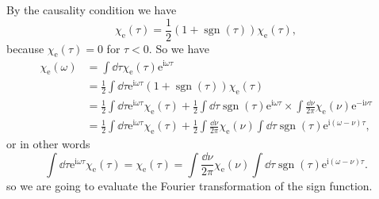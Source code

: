 \documentclass[hyperref, a4paper]{article}
\DeclareMathOperator{\sgn}{sgn}
\newcommand*{\ii}{\mathrm{i}}
\newcommand*{\ee}{\mathrm{e}}
\begin{document}
By the causality condition we have
\begin{equation}
    \chi_\text{e}(\tau) = \frac{1}{2} (1 + \sgn(\tau)) \chi_\text{e}(\tau),
\end{equation}
because $\chi_\text{e}(\tau) = 0$ for $\tau < 0$.
So we have 
\[
    \begin{aligned}
        \chi_\text{e}(\omega) &= \int \dd{\tau} \chi_\text{e}(\tau) \ee^{\ii \omega \tau} \\
        &= \frac{1}{2} \int \dd{\tau} \ee^{\ii \omega \tau} (1 + \sgn(\tau)) \chi_\text{e}(\tau) \\
        &= \frac{1}{2} \int \dd{\tau} \ee^{\ii \omega \tau} \chi_\text{e}(\tau) + \frac{1}{2} \int \dd{\tau} \sgn(\tau) \ee^{\ii \omega \tau} \times \int \frac{\dd{\nu}}{2\pi}\chi_\text{e}(\nu) \ee^{- \ii \nu \tau} \\
        &= \frac{1}{2} \int \dd{\tau} \ee^{\ii \omega \tau} \chi_\text{e}(\tau) + \frac{1}{2} \int \frac{\dd{\nu}}{2\pi}\chi_\text{e}(\nu) \int \dd{\tau} \sgn(\tau) \ee^{\ii (\omega - \nu) \tau} ,
    \end{aligned}
\]
or in other words
\begin{equation}
    \int \dd{\tau} \ee^{\ii \omega \tau} \chi_\text{e}(\tau) = \chi_\text{e}(\tau) = \int \frac{\dd{\nu}}{2\pi}\chi_\text{e}(\nu) \int \dd{\tau} \sgn(\tau) \ee^{\ii (\omega - \nu) \tau} .
    \label{eq:proto-kk-relation}
\end{equation}
so we are going to evaluate the Fourier transformation of the sign function.
\end{document}
